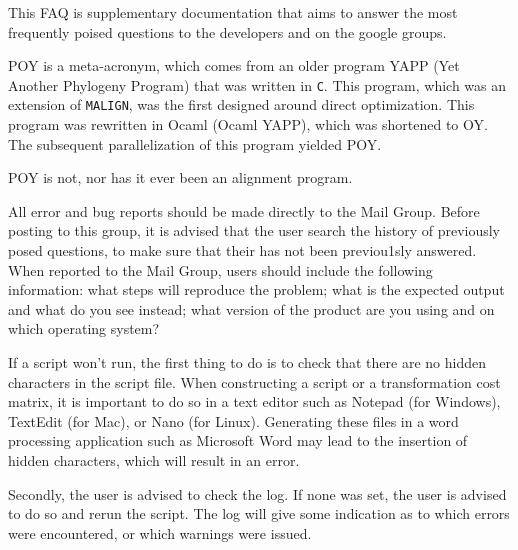 This FAQ is supplementary documentation that aims to answer the most frequently poised questions to 
the \poy developers and on the \poy google groups.

\renewcommand{\cftdotsep}{\cftnodots} %
\listofquestions
\newpage


{POY is a meta-acronym, which comes from an older program YAPP (Yet Another Phylogeny Program) that 
was written in \texttt{C}.  This program, which was an extension of \texttt{MALIGN}, was the first designed around direct 
optimization.  This program was rewritten in Ocaml (Ocaml YAPP), which was shortened to OY.  
The subsequent parallelization of this program yielded POY.}

{POY is not, nor has it ever been an alignment program.}

{All error and bug reports should be made directly to the \poy Mail Group. Before posting to this group, it is advised that the 
user search the history of previously posed questions, to make sure that their has not been previou1sly answered.
When reported to the Mail Group, users should include the following information: what steps will 
reproduce the problem; what is the expected output and what do you see instead;  what version of 
the product are you using and on which operating system?}

{If a script won't run, the first thing to do is to check that there are no hidden characters in the script file.
When constructing a script or a transformation cost matrix, it is important to do so in a text editor 
such as Notepad (for Windows), TextEdit (for Mac), or Nano (for Linux). Generating these files in 
a word processing application such as Microsoft Word may lead to the insertion of hidden 
characters, which will result in an error.

Secondly, the user is advised to check the log.  If none was set, the user is advised to do so and rerun the script.
The log will give some indication as to which errors were encountered, or which warnings were issued.}


